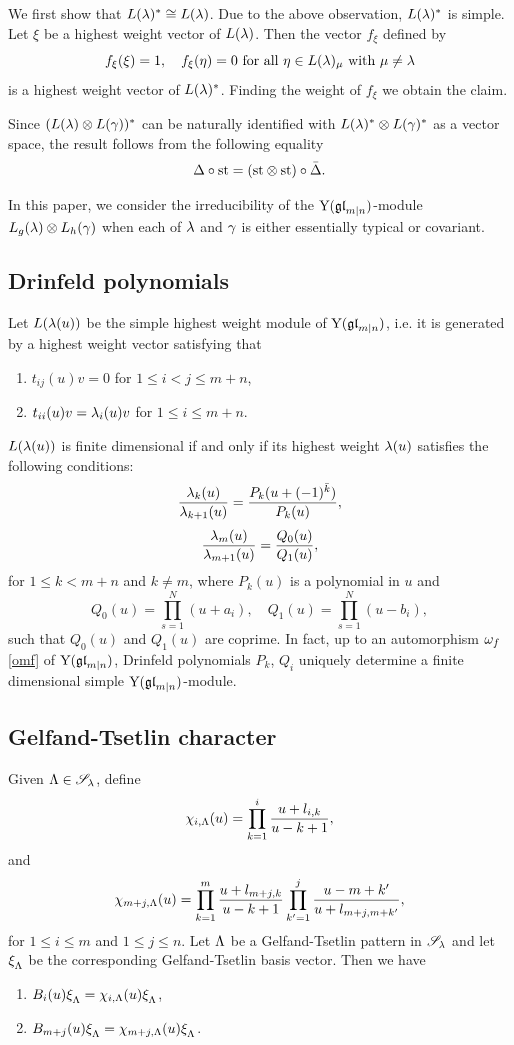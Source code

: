 \documentclass[12pt]{amsart}
\begin{document}
\bpf
We first show that $L(\lambda)^*\cong L(\lambda)$.
Due to the above observation, $L(\lambda)^*$ is simple.
Let $\xi$ be a highest weight vector of $L(\lambda)$. Then
 the vector $f_{\xi}$ defined by
\[
f_{\xi}(\xi)=1,\quad f_{\xi}(\eta)=0 \text{ for all }\eta\in L(\lambda)_{\mu}\text{ with }\mu\neq\lambda
\]
is a highest weight vector of $L(\lambda)^*$.
 Finding the weight of $f_{\xi}$ we obtain the claim.

Since $(L(\lambda)\otimes L(\gamma))^*$ can be naturally identified with $L(\lambda)^*\otimes L(\gamma)^*$ as a vector space, the result
follows from the following equality
\[
\Delta\circ{\rm st}=({\rm st}\otimes{\rm st})\circ\bar{\Delta}.
\]
\epf


In this paper, we consider the irreducibility of the ${\rm Y}(\mathfrak{gl}_{m|n})$-module $L_g(\lambda)\otimes L_h(\gamma)$ when each of $\lambda$ and $\gamma$ is either essentially typical or covariant.

\subsection{Drinfeld polynomials}
Let $L(\lambda(u))$ be the simple highest weight module of ${\rm Y}(\mathfrak{gl}_{m|n})$, i.e. it is generated by a highest weight vector satisfying that
\begin{enumerate}
\item $t_{ij}(u)v=0$ for $1\leq i<j\leq m+n$,
\item $t_{ii}(u)v=\lambda_i(u)v$ for $1\leq i\leq m+n$.
\end{enumerate}

$L(\lambda(u))$ is finite dimensional if and only if its highest weight $\lambda(u)$ satisfies the following conditions:
\[
\frac{\lambda_k(u)}{\lambda_{k+1}(u)}=\frac{P_k(u+(-1)^{\bar{k}})}{P_k(u)},
\]
\[
\frac{\lambda_m(u)}{\lambda_{m+1}(u)}=\frac{Q_0(u)}{Q_1(u)},
\]
for $1\leq k<m+n$ and $k\neq m$, where $P_k(u)$ is a polynomial in $u$ and
\[
Q_0(u)=\prod_{s=1}^{N}(u+a_i),\quad Q_1(u)=\prod_{s=1}^{N}(u-b_i),
\]
such that $Q_0(u)$ and $Q_1(u)$ are coprime.
\eth
In fact, up to an automorphism $\omega_f$ \eqref{omf} of ${\rm Y}(\mathfrak{gl}_{m|n})$, Drinfeld polynomials  $P_k$, $Q_i$  uniquely determine a finite dimensional simple ${\rm Y}(\mathfrak{gl}_{m|n})$-module.

\subsection{Gelfand-Tsetlin character}
Given $\Lambda\in\mathscr{S}_{\lambda}$, define
\[
\chi_{i,\Lambda}(u)=\prod_{k=1}^{i}\frac{u+l_{i,k}}{u-k+1},
\]
and
\[
\chi_{m+j,\Lambda}(u)=\prod_{k=1}^{m}\frac{u+l_{m+j,k}}{u-k+1}\prod_{k'=1}^{j}\frac{u-m+k'}{u+l_{m+j,m+k'}},
\]
for $1\leq i\leq m$ and $1\leq j\leq n$.
\ble\label{lem:chkL}
Let $\Lambda$ be a Gelfand-Tsetlin pattern in $\mathscr{S}_{\lambda}$ and let $\xi^{}_{\Lambda}$ be the corresponding Gelfand-Tsetlin basis vector.
Then we have
\begin{enumerate}
\item $B_i(u)\xi^{}_{\Lambda}=\chi_{i,\Lambda}(u)\xi^{}_{\Lambda}$,
\item $B_{m+j}(u)\xi^{}_{\Lambda}=\chi_{m+j,\Lambda}(u)\xi^{}_{\Lambda}$.
\end{enumerate}
\ele
\end{document}
